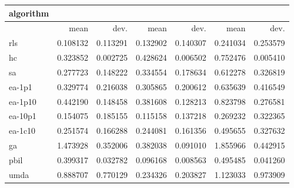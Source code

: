 \begin{tabular}{@{}l*{6}{>{{}}N{1}{2}}@{}}
\toprule
{algorithm} &  &  &  \\
\midrule
& {mean} & {dev.} & {mean} & {dev.} & {mean} & {dev.} \\
\midrule
rls & 0.108132 & 0.113291 & 0.132902 & 0.140307 & 0.241034 & 0.253579 \\
 hc & 0.323852 & 0.002725 & 0.428624 & 0.006502 & 0.752476 & 0.005410 \\
 sa & 0.277723 & 0.148222 & 0.334554 & 0.178634 & 0.612278 & 0.326819 \\
 ea-1p1 & 0.329774 & 0.216038 & 0.305865 & 0.200612 & 0.635639 & 0.416549 \\
 ea-1p10 & 0.442190 & 0.148458 & 0.381608 & 0.128213 & 0.823798 & 0.276581 \\
 ea-10p1 & 0.154075 & 0.185155 & 0.115158 & 0.137218 & 0.269232 & 0.322365 \\
 ea-1c10 & 0.251574 & 0.166288 & 0.244081 & 0.161356 & 0.495655 & 0.327632 \\
 ga & 1.473928 & 0.352006 & 0.382038 & 0.091010 & 1.855966 & 0.442915 \\
 pbil & 0.399317 & 0.032782 & 0.096168 & 0.008563 & 0.495485 & 0.041260 \\
 umda & 0.888707 & 0.770129 & 0.234326 & 0.203827 & 1.123033 & 0.973909 \\
 \bottomrule
\end{tabular}
